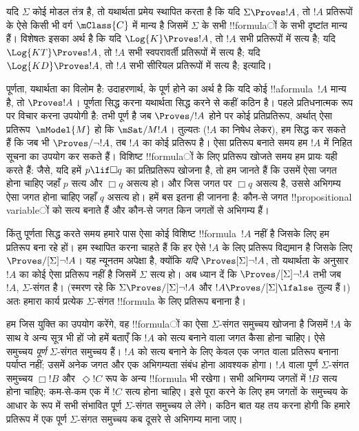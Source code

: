 \documentclass[../../../include/open-logic-section]{subfiles}
\begin{document}


यदि $\Sigma$ कोई मोडल तंत्र है, तो यथार्थता प्रमेय स्थापित करता है कि यदि
$\Sigma \Proves !A$, तो $!A$ प्रतिरूपों के ऐसे किसी भी वर्ग
$\mClass{C}$ में मान्य है जिसमें $\Sigma$ के सभी !!{formula}ों के सभी
दृष्टांत मान्य हैं। विशेषतः इसका अर्थ है कि यदि $\Log{K} \Proves !A$,
तो $!A$ सभी प्रतिरूपों में सत्य है; यदि $\Log{KT} \Proves !A$, तो $!A$
सभी स्वपरावर्ती प्रतिरूपों में सत्य है; यदि $\Log{KD} \Proves !A$, तो
$!A$ सभी सीरियल प्रतिरूपों में सत्य है; इत्यादि।

पूर्णता, यथार्थता का विलोम है: उदाहरणार्थ,  के पूर्ण होने का अर्थ
है कि यदि कोई !!a{formula}~$!A$ मान्य है, तो $\Proves !A$। पूर्णता सिद्ध
करना यथार्थता सिद्ध करने से कहीं कठिन है। पहले प्रतिधनात्मक रूप पर विचार
करना उपयोगी है:  तभी पूर्ण है जब $\Proves/ !A$ होने पर कोई
प्रतिप्रतिरूप, अर्थात् ऐसा प्रतिरूप~$\mModel{M}$ हो कि
$\mSat/{M}{!A}$। तुल्यतः ($!A$ का निषेध लेकर), हम सिद्ध कर सकते हैं कि जब
भी $\Proves/ \lnot !A$, तब $!A$ का कोई प्रतिरूप है। ऐसा प्रतिरूप बनाते
समय हम $!A$ में निहित सूचना का उपयोग कर सकते हैं। विशिष्ट !!{formula}ों के
लिए प्रतिरूप खोजते समय हम प्रायः यही करते हैं: जैसे, यदि हमें $p \lif
\Box q$ का प्रतिप्रतिरूप खोजना है, तो हम जानते हैं कि उसमें ऐसा जगत होना
चाहिए जहाँ $p$ सत्य और $\Box q$ असत्य हो। और जिस जगत पर $\Box q$ असत्य
है, उससे अभिगम्य ऐसा जगत होना चाहिए जहाँ $q$ असत्य हो। हमें बस इतना ही
जानना है: कौन-से जगत !!{propositional variable}ों को सत्य बनाते हैं और कौन-से
जगत किन जगतों से अभिगम्य हैं।

किंतु पूर्णता सिद्ध करते समय हमारे पास ऐसा कोई विशिष्ट !!{formula}~$!A$
नहीं है जिसके लिए हम प्रतिरूप बना रहे हों। हम स्थापित करना चाहते हैं कि
हर ऐसे $!A$ के लिए प्रतिरूप विद्यमान है जिसके लिए $\Proves/[\Sigma]
\lnot !A$। यह न्यूनतम अपेक्षा है, क्योंकि \emph{यदि}
$\Proves[\Sigma] \lnot !A$, तो यथार्थता के अनुसार $!A$ का कोई ऐसा
प्रतिरूप नहीं है जिसमें $\Sigma$ सत्य हो। अब ध्यान दें कि
$\Proves/[\Sigma] \lnot !A$ तभी जब $!A$, $\Sigma$-संगत है। (स्मरण रहे
कि $\Sigma \Proves/[\Sigma] \lnot !A$ और $!A \Proves/[\Sigma]
\lfalse$ तुल्य हैं।) अतः हमारा कार्य प्रत्येक $\Sigma$-संगत !!{formula}
के लिए प्रतिरूप बनाना है।

हम जिस युक्ति का उपयोग करेंगे, वह !!{formula}ों का ऐसा $\Sigma$-संगत
समुच्चय खोजना है जिसमें $!A$ के साथ वे अन्य सूत्र भी हों जो हमें बताएँ
कि $!A$ को सत्य बनाने वाला जगत कैसा होना चाहिए। ऐसे समुच्चय
\emph{पूर्ण} $\Sigma$-संगत समुच्चय हैं। $!A$ को सत्य बनाने के लिए केवल
एक जगत वाला प्रतिरूप बनाना पर्याप्त नहीं; उसमें अनेक जगत और एक अभिगम्यता
संबंध होना आवश्यक होगा। $!A$ वाला पूर्ण $\Sigma$-संगत समुच्चय
$\Box !B$ और~$\Diamond !C$ रूप के अन्य !!{formula} भी रखेगा। सभी अभिगम्य
जगतों में $!B$ सत्य होना चाहिए; कम-से-कम एक में $!C$ सत्य होना चाहिए। इसे
पूरा करने के लिए हम जगतों के समुच्चय के आधार के रूप में सभी संभावित पूर्ण
$\Sigma$-संगत समुच्चय ले लेंगे। कठिन बात यह तय करना होगी कि हमारे
प्रतिरूप में एक पूर्ण $\Sigma$-संगत समुच्चय कब दूसरे से अभिगम्य माना जाए।
\end{document}
